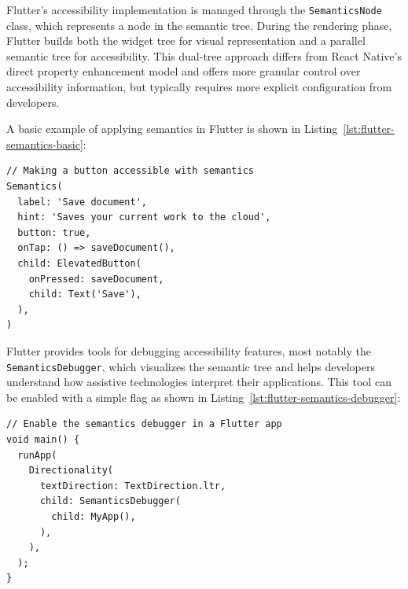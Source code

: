 Flutter's accessibility implementation is managed through the \texttt{SemanticsNode} class, which represents a node in the semantic tree. During the rendering phase, Flutter builds both the widget tree for visual representation and a parallel semantic tree for accessibility. This dual-tree approach differs from React Native's direct property enhancement model and offers more granular control over accessibility information, but typically requires more explicit configuration from developers.

A basic example of applying semantics in Flutter is shown in Listing~\ref{lst:flutter-semantics-basic}:

\begin{lstlisting}[style=DartStyle, caption=Basic Semantics implementation in Flutter, label=lst:flutter-semantics-basic]
// Making a button accessible with semantics
Semantics(
  label: 'Save document',
  hint: 'Saves your current work to the cloud',
  button: true,
  onTap: () => saveDocument(),
  child: ElevatedButton(
    onPressed: saveDocument,
    child: Text('Save'),
  ),
)
\end{lstlisting}

Flutter provides tools for debugging accessibility features, most notably the \\ \texttt{SemanticsDebugger}, which visualizes the semantic tree and helps developers understand how assistive technologies interpret their applications. This tool can be enabled with a simple flag as shown in Listing~\ref{lst:flutter-semantics-debugger}:

\begin{lstlisting}[style=DartStyle, caption=Using the SemanticsDebugger in Flutter, label=lst:flutter-semantics-debugger]
// Enable the semantics debugger in a Flutter app
void main() {
  runApp(
    Directionality(
      textDirection: TextDirection.ltr,
      child: SemanticsDebugger(
        child: MyApp(),
      ),
    ),
  );
}
\end{lstlisting}

